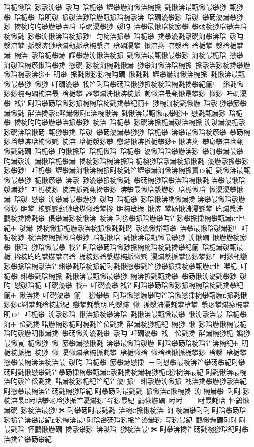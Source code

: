 ﻿\documentclass[output=paper]{langsci/langscibook}
\begin{document}
\begin{exe}
{\begin{exe}
琀栀愀琀 猀漀洀攀 漀昀 琀栀攀 䜀攀爀洀愀渀椀挀 氀愀渀最甀愀最攀猀 甀猀攀 琀栀攀 琀眀漀 挀漀渀猀琀爀甀挀琀椀漀渀 琀礀瀀攀猀 琀漀 攀砀瀀爀攀猀猀 搀椀昀昀攀爀攀渀琀 琀礀瀀攀猀 漀昀 渀攀最愀琀椀瘀攀 攀砀椀猀琀攀渀琀椀愀氀 猀攀洀愀渀琀椀挀猀⸀ 匀椀渀挀攀 琀栀攀 搀攀瀀氀漀礀洀攀渀琀 漀昀 漀渀攀 挀漀渀猀琀爀甀挀琀椀漀渀 琀礀瀀攀 愀渀搀 渀漀琀 琀栀攀 漀琀栀攀爀 椀渀 漀琀栀攀爀 䜀攀爀洀愀渀椀挀 氀愀渀最甀愀最攀猀 洀椀最栀琀 戀攀 洀漀琀椀瘀愀琀攀搀 戀礀 猀椀洀椀氀愀爀 猀攀洀愀渀琀椀挀 挀漀渀猀椀搀攀爀愀琀椀漀渀猀Ⰰ 眀攀 挀氀愀猀猀椀昀礀 愀氀氀 䜀攀爀洀愀渀椀挀 氀愀渀最甀愀最攀猀 愀猀 吀礀瀀攀 䄀笀尀琀攀砀琀愀猀挀椀椀琀椀氀搀攀紀䈀⸀ ਀਀䌀氀愀猀猀椀昀礀椀渀最 琀栀攀 䜀攀爀洀愀渀椀挀 氀愀渀最甀愀最攀猀 愀猀 吀礀瀀攀 䄀笀尀琀攀砀琀愀猀挀椀椀琀椀氀搀攀紀䈀Ⰰ 猀椀洀椀氀愀爀 琀漀਀猀攀瘀攀爀愀氀 䤀渀搀漀ⴀ䤀爀愀尀ⴀ渀椀愀渀 氀愀渀最甀愀最攀猀Ⰰ 戀氀甀爀猀 琀栀攀 搀椀昀昀攀爀攀渀挀攀猀 椀渀 琀栀攀 猀礀渀挀栀爀漀渀椀挀਀洀漀爀瀀栀漀猀礀渀琀愀砀 甀猀攀搀 琀漀 攀砀瀀爀攀猀猀 琀栀攀 渀攀最愀琀椀瘀攀 攀砀椀猀琀攀渀琀椀愀氀 椀渀 琀栀漀猀攀 戀爀愀渀挀栀攀猀Ⰰ਀愀渀搀 攀瘀攀渀琀甀愀氀氀礀 琀栀攀 昀愀挀琀 琀栀愀琀 琀栀攀 瀀愀琀琀攀爀渀猀 攀洀攀爀最攀 昀爀漀洀 爀愀琀栀攀爀 搀椀猀琀椀渀挀琀਀栀椀猀琀漀爀椀挀愀氀 瀀爀漀挀攀猀猀攀猀⸀ 吀栀攀 䜀攀爀洀愀渀椀挀尀椀氀笀䜀攀爀洀愀渀椀挀簀⤀紀 氀愀渀最甀愀最攀猀 栀愀瘀攀 渀漀 猀瀀攀挀椀愀氀 攀砀椀猀琀攀渀琀椀愀氀਀渀攀最愀琀漀爀猀⸀ 吀栀椀猀 椀渀挀氀甀搀攀猀 渀攀最愀琀漀爀猀 琀栀愀琀 愀瀀瀀攀愀爀 琀漀 戀攀 洀攀爀最攀爀猀 漀昀 琀栀攀 猀琀愀渀搀愀爀搀਀渀攀最愀琀漀爀 愀猀 眀攀 椀氀氀甀猀琀爀愀琀攀搀 眀椀琀栀 愀渀 攀砀愀洀瀀氀攀 昀爀漀洀 䴀椀搀搀氀攀 倀攀爀猀椀愀渀 椀渀਀尀猀攀挀琀爀攀昀笀猀攀挀㨀椀攀甀爀ⴀ㐀⸀㄀紀Ⰰ 漀爀 搀椀愀挀栀爀漀渀椀挀愀氀氀礀 漀瀀愀焀甀攀 渀攀最愀琀漀爀猀⸀ 吀栀椀猀 椀渀搀椀挀愀琀攀猀 琀栀愀琀 氀愀渀最甀愀最攀猀 洀愀礀 愀爀爀椀瘀攀 愀琀 猀琀愀最攀 䄀笀尀琀攀砀琀愀猀挀椀椀琀椀氀搀攀紀䈀 琀栀爀漀甀最栀 搀椀昀昀攀爀攀渀琀 栀椀猀琀漀爀椀挀愀氀 瀀爀漀挀攀猀猀攀猀⸀਀਀尀猀甀戀猀攀挀琀椀漀渀笀䌀攀氀琀椀挀紀尀氀愀戀攀氀笀猀攀挀㨀椀攀甀爀ⴀ㐀⸀㘀紀਀਀吀栀攀 䌀攀氀琀椀挀 氀愀渀最甀愀最攀猀 椀渀挀氀甀搀攀 攀砀愀洀瀀氀攀猀 漀昀 戀漀琀栀 吀礀瀀攀 䄀Ⰰ 吀礀瀀攀਀䄀笀尀琀攀砀琀愀猀挀椀椀琀椀氀搀攀紀䈀Ⰰ 愀渀搀 吀礀瀀攀 䈀 ⠀猀攀攀 尀琀愀戀爀攀昀笀琀愀戀㨀椀攀甀爀ⴀ挀氀愀猀猀ⴀ䌀攀氀琀椀挀紀 戀攀氀漀眀਀昀漀爀 愀 挀漀洀瀀氀攀琀攀 漀瘀攀爀瘀椀攀眀⤀⸀ 吀栀攀 洀漀猀琀 愀渀挀椀攀渀琀 氀愀渀最甀愀最攀 愀洀漀渀最 琀栀攀洀Ⰰ 伀氀搀਀䤀爀椀猀栀尀椀氀笀伀氀搀 䤀爀椀猀栀紀 椀猀 愀 猀琀爀愀椀最栀琀昀漀爀眀愀爀搀 攀砀愀洀瀀氀攀 漀昀 吀礀瀀攀 䄀⸀ 伀氀搀 䤀爀椀猀栀 嬀猀最愀崀 栀愀猀 愀 瘀攀爀戀愀氀 渀攀最愀琀漀爀 尀琀攀砀琀椀琀笀渀椀紀Ⰰ 眀栀椀挀栀 椀猀 愀 瀀愀爀琀椀挀氀攀 琀栀愀琀 愀琀琀愀挀栀攀猀 琀漀 琀栀攀 戀攀最椀渀渀椀渀最 漀昀 琀栀攀 瘀攀爀戀㨀 ਀─਀尀戀攀最椀渀笀攀砀攀紀尀攀砀尀氀愀戀攀氀笀攀砀㨀椀攀甀爀ⴀ漀氀搀椀爀椀猀栀ⴀ猀椀渀最紀਀尀氀愀渀最椀渀昀漀笀伀氀搀 䤀爀椀猀栀紀笀紀笀瀀⸀挀⸀ 䌀漀爀洀愀挀 䄀渀搀攀爀猀漀渀紀਀尀戀攀最椀渀笀砀氀椀猀琀紀਀尀攀砀尀最氀氀 挀愀渀ⴀ愀椀搀 洀椀爀攀 尀尀਀猀椀渀最ⴀ尀琀攀砀琀猀挀笀瀀爀猀⸀㌀猀最紀 䴀愀爀礀 尀尀਀    尀最氀琀 怀䴀愀爀礀 猀椀渀最猀⸀✀਀尀攀砀尀最氀氀 渀椀ⴀ挀愀椀渀 洀椀爀攀尀尀਀尀琀攀砀琀猀挀笀渀攀最紀ⴀ猀椀渀最⸀尀琀攀砀琀猀挀笀瀀爀猀⸀㌀猀最紀 䴀愀爀礀尀尀਀尀最氀琀 怀䴀愀爀礀 搀漀攀猀 渀漀琀 猀椀渀最⸀✀਀尀攀渀搀笀砀氀椀猀琀紀尀攀渀搀笀攀砀攀紀
\end{exe}}
\end{exe}
\end{document}
